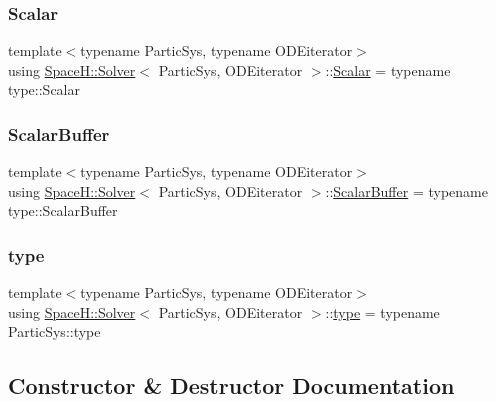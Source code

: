 \subsubsection{\texorpdfstring{Scalar}{Scalar}}
{\footnotesize\ttfamily template$<$typename Partic\+Sys, typename O\+D\+Eiterator$>$ \\
using \mbox{\hyperlink{class_space_h_1_1_solver}{Space\+H\+::\+Solver}}$<$ Partic\+Sys, O\+D\+Eiterator $>$\+::\mbox{\hyperlink{class_space_h_1_1_solver_aa0ade682bd07e13fef77e7dcbeb6b46a}{Scalar}} =  typename type\+::\+Scalar}

\mbox{\label{class_space_h_1_1_solver_a218013786e16f411e8c72cb82a180a05}} 
\subsubsection{\texorpdfstring{Scalar\+Buffer}{ScalarBuffer}}
{\footnotesize\ttfamily template$<$typename Partic\+Sys, typename O\+D\+Eiterator$>$ \\
using \mbox{\hyperlink{class_space_h_1_1_solver}{Space\+H\+::\+Solver}}$<$ Partic\+Sys, O\+D\+Eiterator $>$\+::\mbox{\hyperlink{class_space_h_1_1_solver_a218013786e16f411e8c72cb82a180a05}{Scalar\+Buffer}} =  typename type\+::\+Scalar\+Buffer}

\mbox{\label{class_space_h_1_1_solver_a6f82bc1008c7f769d2c95bdcbb49e463}} 
\subsubsection{\texorpdfstring{type}{type}}
{\footnotesize\ttfamily template$<$typename Partic\+Sys, typename O\+D\+Eiterator$>$ \\
using \mbox{\hyperlink{class_space_h_1_1_solver}{Space\+H\+::\+Solver}}$<$ Partic\+Sys, O\+D\+Eiterator $>$\+::\mbox{\hyperlink{class_space_h_1_1_solver_a6f82bc1008c7f769d2c95bdcbb49e463}{type}} =  typename Partic\+Sys\+::type}



\subsection{Constructor \& Destructor Documentation}
\mbox{\label{class_space_h_1_1_solver_ab2d2219ff8d7882b91e20daba262a0f1}} 
